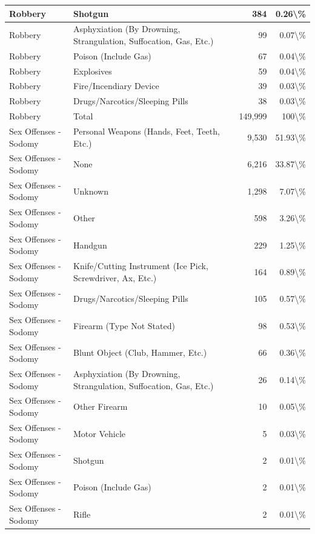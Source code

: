 \documentclass[
]{krantz}
\begin{document}
\begin{longtable}[t]{l|l|r|r}
\hline
Robbery & Shotgun & 384 & 0.26\textbackslash{}\%\\
\hline
Robbery & Asphyxiation (By Drowning, Strangulation, Suffocation, Gas, Etc.) & 99 & 0.07\textbackslash{}\%\\
\hline
Robbery & Poison (Include Gas) & 67 & 0.04\textbackslash{}\%\\
\hline
Robbery & Explosives & 59 & 0.04\textbackslash{}\%\\
\hline
Robbery & Fire/Incendiary Device & 39 & 0.03\textbackslash{}\%\\
\hline
Robbery & Drugs/Narcotics/Sleeping Pills & 38 & 0.03\textbackslash{}\%\\
\hline
Robbery & Total & 149,999 & 100\textbackslash{}\%\\
\hline
Sex Offenses - Sodomy & Personal Weapons (Hands, Feet, Teeth, Etc.) & 9,530 & 51.93\textbackslash{}\%\\
\hline
Sex Offenses - Sodomy & None & 6,216 & 33.87\textbackslash{}\%\\
\hline
Sex Offenses - Sodomy & Unknown & 1,298 & 7.07\textbackslash{}\%\\
\hline
Sex Offenses - Sodomy & Other & 598 & 3.26\textbackslash{}\%\\
\hline
Sex Offenses - Sodomy & Handgun & 229 & 1.25\textbackslash{}\%\\
\hline
Sex Offenses - Sodomy & Knife/Cutting Instrument (Ice Pick, Screwdriver, Ax, Etc.) & 164 & 0.89\textbackslash{}\%\\
\hline
Sex Offenses - Sodomy & Drugs/Narcotics/Sleeping Pills & 105 & 0.57\textbackslash{}\%\\
\hline
Sex Offenses - Sodomy & Firearm (Type Not Stated) & 98 & 0.53\textbackslash{}\%\\
\hline
Sex Offenses - Sodomy & Blunt Object (Club, Hammer, Etc.) & 66 & 0.36\textbackslash{}\%\\
\hline
Sex Offenses - Sodomy & Asphyxiation (By Drowning, Strangulation, Suffocation, Gas, Etc.) & 26 & 0.14\textbackslash{}\%\\
\hline
Sex Offenses - Sodomy & Other Firearm & 10 & 0.05\textbackslash{}\%\\
\hline
Sex Offenses - Sodomy & Motor Vehicle & 5 & 0.03\textbackslash{}\%\\
\hline
Sex Offenses - Sodomy & Shotgun & 2 & 0.01\textbackslash{}\%\\
\hline
Sex Offenses - Sodomy & Poison (Include Gas) & 2 & 0.01\textbackslash{}\%\\
\hline
Sex Offenses - Sodomy & Rifle & 2 & 0.01\textbackslash{}\%\\

\end{longtable}
\end{document}

